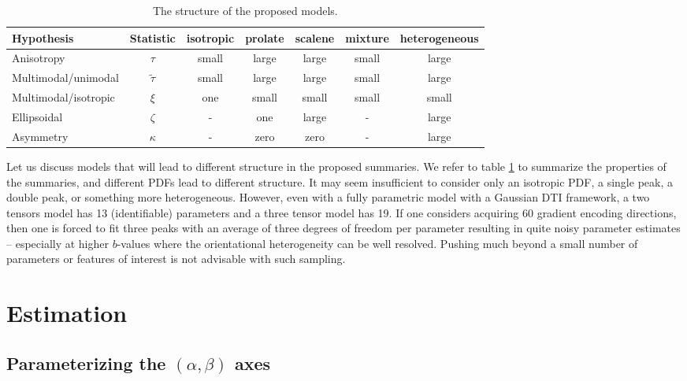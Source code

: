 \documentclass[dvips,aoas,preprint]{imsart}
\numberwithin{equation}{section}
\theoremstyle{plain}
\begin{document}
\begin{table}[!htbp]
  \caption{The structure of the proposed models.}
  \label{summaryofprop}
    \begin{tabular}{lcccccc}
      \hline
      Hypothesis & Statistic & isotropic & prolate & scalene & mixture & heterogeneous\\ 
      \hline
      Anisotropy & $\tau$ & small & large & large & small & large \\ 
      Multimodal/unimodal & $\tilde{\tau}$ & small & large & large & small & large \\ 
      Multimodal/isotropic & $\xi$ & one  & small & small & small & small\\
      Ellipsoidal & $\zeta$& - & one & large & - & large\\
      Asymmetry & $\kappa$& - & zero & zero & - & large\\
      \hline
    \end{tabular}
\end{table}

Let us discuss models that will lead to different structure in the
proposed summaries. We refer to table \ref{summaryofprop} to summarize
the properties of the summaries, and different PDFs lead to different
structure.  It may seem insufficient to consider only an isotropic
PDF, a single peak, a double peak, or something more heterogeneous.
However, even with a fully parametric model with a Gaussian DTI
framework, a two tensors model has 13 (identifiable) parameters and a
three tensor model has 19.  If one considers acquiring 60 gradient
encoding directions, then one is forced to fit three peaks with an
average of three degrees of freedom per parameter resulting in quite
noisy parameter estimates -- especially at higher $b$-values where the
orientational heterogeneity can be well resolved.  Pushing much beyond
a small number of parameters or features of interest is not advisable
with such sampling.

\section{Estimation}
\label{matmeth}

\subsection{Parameterizing the $(\alpha,\beta)$ axes}
\end{document}
